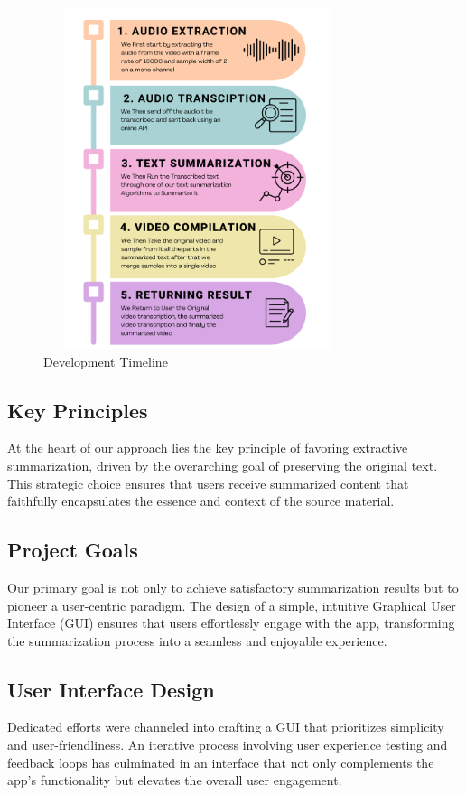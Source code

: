 \documentclass{ieeeaccess}
\begin{document}
\begin{figure}	[!htb]
    \centering
    \includegraphics[width=9cm, height=10cm, keepaspectratio]{images/Methodology.png}
    \caption{Development Timeline}
    \label{frameworks_and_libraries}
\end{figure} 

\subsection{Key Principles}
At the heart of our approach lies the key principle of favoring extractive summarization, driven by the overarching goal of preserving the original text. This strategic choice ensures that users receive summarized content that faithfully encapsulates the essence and context of the source material.

\subsection{Project Goals}
Our primary goal is not only to achieve satisfactory summarization results but to pioneer a user-centric paradigm. The design of a simple, intuitive Graphical User Interface (GUI) ensures that users effortlessly engage with the app, transforming the summarization process into a seamless and enjoyable experience.

\subsection{User Interface Design}
Dedicated efforts were channeled into crafting a GUI that prioritizes simplicity and user-friendliness. An iterative process involving user experience testing and feedback loops has culminated in an interface that not only complements the app's functionality but elevates the overall user engagement.
\end{document}
